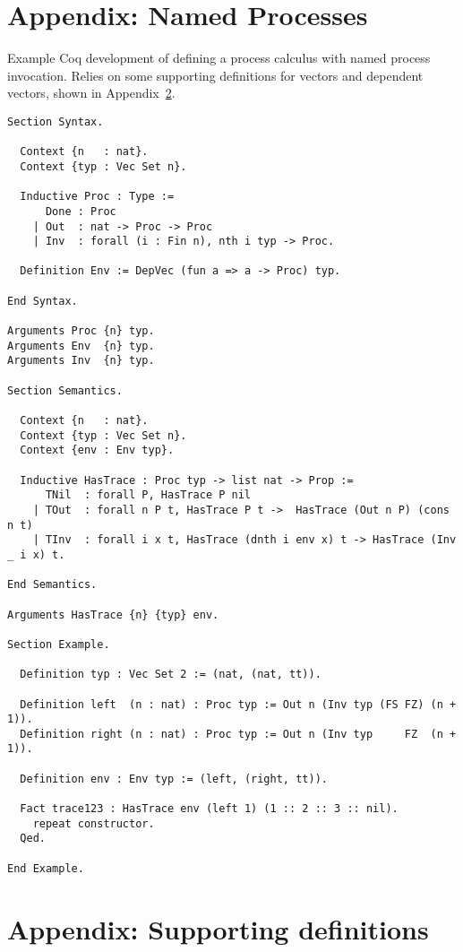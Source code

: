 \documentclass{article}
\begin{document}
\appendix

\section{Appendix: Named Processes}
\label{app:namedproc}

Example Coq development of defining a process calculus with named
process invocation. Relies on some supporting definitions for vectors and
dependent vectors, shown in Appendix~\ref{app:coqaux}.

\begin{lstlisting}[language=Coq]
Section Syntax.

  Context {n   : nat}.
  Context {typ : Vec Set n}.

  Inductive Proc : Type :=
      Done : Proc
    | Out  : nat -> Proc -> Proc
    | Inv  : forall (i : Fin n), nth i typ -> Proc.

  Definition Env := DepVec (fun a => a -> Proc) typ.

End Syntax.

Arguments Proc {n} typ.
Arguments Env  {n} typ.
Arguments Inv  {n} typ.

Section Semantics.

  Context {n   : nat}.
  Context {typ : Vec Set n}.
  Context {env : Env typ}.

  Inductive HasTrace : Proc typ -> list nat -> Prop :=
      TNil  : forall P, HasTrace P nil
    | TOut  : forall n P t, HasTrace P t ->  HasTrace (Out n P) (cons n t)
    | TInv  : forall i x t, HasTrace (dnth i env x) t -> HasTrace (Inv _ i x) t.

End Semantics.

Arguments HasTrace {n} {typ} env.

Section Example.

  Definition typ : Vec Set 2 := (nat, (nat, tt)).

  Definition left  (n : nat) : Proc typ := Out n (Inv typ (FS FZ) (n + 1)).
  Definition right (n : nat) : Proc typ := Out n (Inv typ     FZ  (n + 1)).

  Definition env : Env typ := (left, (right, tt)).

  Fact trace123 : HasTrace env (left 1) (1 :: 2 :: 3 :: nil).
    repeat constructor.
  Qed.

End Example.
\end{lstlisting}

\section{Appendix: Supporting definitions}
\label{app:coqaux}
\end{document}
